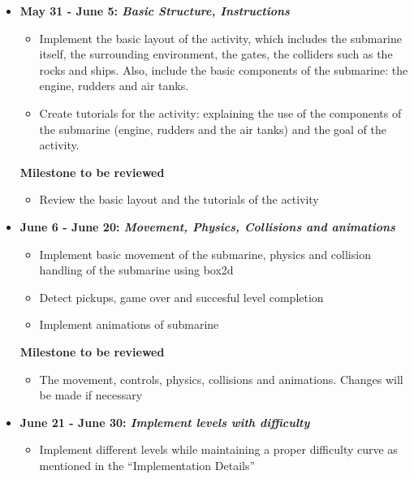 \documentclass[preprint,12pt]{elsarticle}
\begin{document}
\begin{itemize}

\item \textbf{May 31 - June 5: \textit{Basic Structure, Instructions}}

\begin{itemize}
\item Implement the basic layout of the activity, which includes the submarine itself, the surrounding environment, the gates, the colliders such as the rocks and ships. Also, include the basic components of the submarine: the engine, rudders and air tanks.

\item Create tutorials for the activity: explaining the use of the components of the submarine (engine, rudders and the air tanks) and the goal of the activity.

\end{itemize}

\textbf{Milestone to be reviewed}
\begin{itemize}
\item Review the basic layout and the tutorials of the activity
\end{itemize}

\item \textbf{June 6 - June 20: \textit{Movement, Physics, Collisions and animations}}

\begin{itemize}
\item Implement basic movement of the submarine, physics and collision handling of the submarine using box2d
\item Detect pickups, game over and succesful level completion
\item Implement animations of submarine
\end{itemize}

\textbf{Milestone to be reviewed}
\begin{itemize}
\item The movement, controls, physics, collisions and animations. Changes will be made if necessary
\end{itemize}

\item \textbf{June 21 - June 30: \textit{Implement levels with difficulty}}
\begin{itemize}
\item Implement different levels while maintaining a proper difficulty curve as mentioned in the “Implementation Details”
\end{itemize}


\end{itemize}
\end{document}
